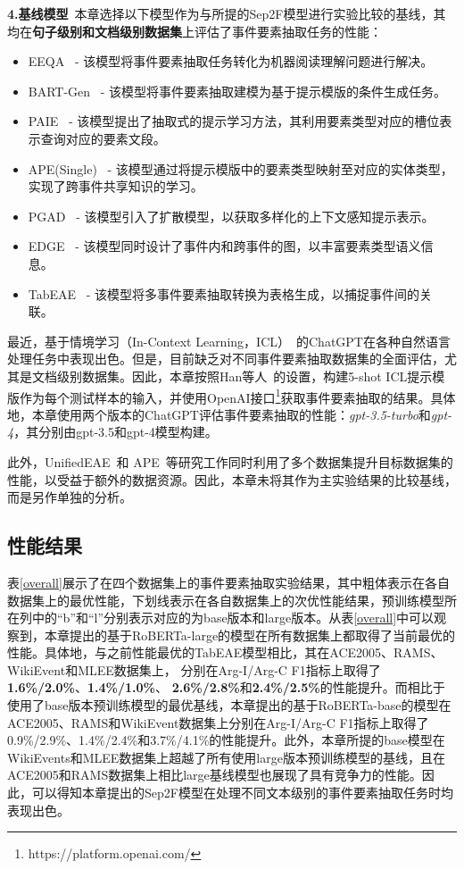 \textbf{4.基线模型}~本章选择以下模型作为与所提的Sep2F模型进行实验比较的基线，其均在\textbf{句子级别和文档级别数据集}上评估了事件要素抽取任务的性能：
\begin{itemize}

\item EEQA~\cite{du2020event} - 该模型将事件要素抽取任务转化为机器阅读理解问题进行解决。
\item BART-Gen~\cite{li2021document} - 该模型将事件要素抽取建模为基于提示模版的条件生成任务。
\item PAIE~\cite{ma2022prompt} - 该模型提出了抽取式的提示学习方法，其利用要素类型对应的槽位表示查询对应的要素文段。
\item APE(Single)~\cite{zhang2023overlap} - 该模型通过将提示模版中的要素类型映射至对应的实体类型，实现了跨事件共享知识的学习。
\item PGAD~\cite{luo2023context} - 该模型引入了扩散模型，以获取多样化的上下文感知提示表示。
\item EDGE~\cite{li2023intra} - 该模型同时设计了事件内和跨事件的图，以丰富要素类型语义信息。
\item TabEAE~\cite{he2023revisiting} - 该模型将多事件要素抽取转换为表格生成，以捕捉事件间的关联。

\end{itemize}

最近，基于情境学习（In-Context Learning，ICL）~\cite{brown2020language}的ChatGPT在各种自然语言处理任务中表现出色。但是，目前缺乏对不同事件要素抽取数据集的全面评估，尤其是文档级别数据集。因此，本章按照Han等人~\cite{han2023information}的设置，构建5-shot ICL提示模版作为每个测试样本的输入，并使用OpenAI接口\footnote{https://platform.openai.com/}获取事件要素抽取的结果。具体地，本章使用两个版本的ChatGPT评估事件要素抽取的性能：\emph{gpt-3.5-turbo}和\emph{gpt-4}，其分别由gpt-3.5和gpt-4模型构建。

此外，UnifiedEAE~\cite{zhou2022multi}和 APE~\cite{zhang2023overlap}等研究工作同时利用了多个数据集提升目标数据集的性能，以受益于额外的数据资源。因此，本章未将其作为主实验结果的比较基线，而是另作单独的分析。

\subsection{性能结果}
表\ref{overall}展示了在四个数据集上的事件要素抽取实验结果，其中粗体表示在各自数据集上的最优性能，下划线表示在各自数据集上的次优性能结果，预训练模型所在列中的“b”和“l”分别表示对应的为base版本和large版本。从表\ref{overall}中可以观察到，本章提出的基于RoBERTa-large的模型在所有数据集上都取得了当前最优的性能。具体地，与之前性能最优的TabEAE模型相比，其在ACE2005、RAMS、 WikiEvent和MLEE数据集上，
分别在Arg-I/Arg-C F1指标上取得了\textbf{1.6\%/2.0\%}、\textbf{1.4\%/1.0\%}、 \textbf{2.6\%/2.8\%}和\textbf{2.4\%/2.5\%}的性能提升。而相比于使用了base版本预训练模型的最优基线，本章提出的基于RoBERTa-base的模型在ACE2005、RAMS和WikiEvent数据集上分别在Arg-I/Arg-C F1指标上取得了0.9\%/2.9\%、1.4\%/2.4\%和3.7\%/4.1\%的性能提升。此外，本章所提的base模型在WikiEvents和MLEE数据集上超越了所有使用large版本预训练模型的基线，且在ACE2005和RAMS数据集上相比large基线模型也展现了具有竞争力的性能。因此，可以得知本章提出的Sep2F模型在处理不同文本级别的事件要素抽取任务时均表现出色。

